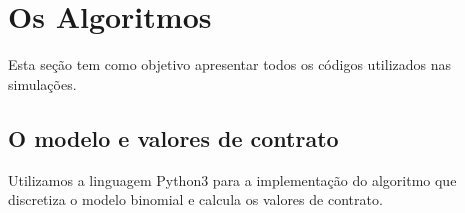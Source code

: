 \documentclass[
	11pt,				%
	openright,			%
	oneside,			%
	a4paper,			%
	english,			%
	french,				%
	spanish,			%
	brazil,				%
	]{abntex2}
\begin{document}

\frenchspacing



\imprimirfolhaderosto*

\tableofcontents*
\cleardoublepage

\chapter{Os Algoritmos}
Esta seção tem como objetivo apresentar todos os códigos utilizados nas simulações.
\section{O modelo e valores de contrato}

Utilizamos a linguagem {\color{green}Python3} para a implementação do algoritmo que discretiza o modelo binomial e calcula os valores de contrato.
\end{document}
